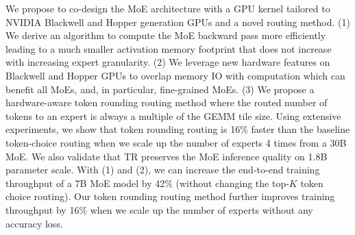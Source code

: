  We propose to co-design the MoE architecture with a GPU kernel tailored to NVIDIA Blackwell and Hopper generation GPUs and a novel routing method. (1) We derive an algorithm to compute the MoE backward pass more efficiently leading to a much smaller activation memory footprint that does not increase with increasing expert granularity. (2) We leverage new hardware features on Blackwell and Hopper GPUs to overlap memory IO with computation which can benefit all MoEs, and, in particular, fine-grained MoEs. (3) We propose a hardware-aware token rounding routing method where the routed number of tokens to an expert is always a multiple of the GEMM tile size. Using extensive experiments, we show that token rounding routing is 16\% faster than the baseline token-choice routing when we scale up the number of experts 4 times from a 30B MoE. We also validate that TR preserves the MoE inference quality on 1.8B parameter scale. With (1) and (2), we can increase the end-to-end training throughput of a 7B MoE model by 42\% (without changing the top-$K$ token choice routing). Our token rounding routing method further improves training throughput by 16\% when we scale up the number of experts without any accuracy loss.











